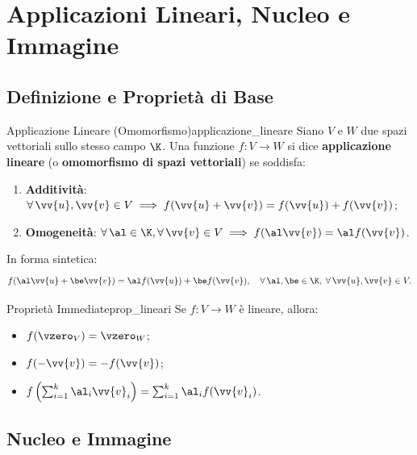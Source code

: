 
\chapter{Applicazioni Lineari, Nucleo e Immagine}
\label{chap:applicazioni_lineari}

\section{Definizione e Proprietà di Base}

\begin{definizione}{Applicazione Lineare (Omomorfismo)}{applicazione_lineare}
Siano $V$ e $W$ due spazi vettoriali sullo stesso campo $\K$. Una funzione $f: V \to W$ si dice \textbf{applicazione lineare} (o \textbf{omomorfismo di spazi vettoriali}) se soddisfa:
\begin{enumerate}[label=(\roman*)]
    \item \textbf{Additività}: $\forall\, \vv{u}, \vv{v} \in V \implies f(\vv{u} + \vv{v}) = f(\vv{u}) + f(\vv{v})$;
    \item \textbf{Omogeneità}: $\forall\, \al \in \K, \forall\, \vv{v} \in V \implies f(\al \vv{v}) = \al f(\vv{v})$.
\end{enumerate}
In forma sintetica:
\begin{equation}
    f(\al \vv{u} + \be \vv{v}) = \al f(\vv{u}) + \be f(\vv{v}), \quad \forall\, \al, \be \in \K,\; \forall\, \vv{u}, \vv{v} \in V.
\end{equation}
\end{definizione}

\begin{proposizione}{Proprietà Immediate}{prop_lineari}
Se $f: V \to W$ è lineare, allora:
\begin{itemize}
    \item $f(\vzero_V) = \vzero_W$;
    \item $f(-\vv{v}) = -f(\vv{v})$;
    \item $f\left(\sum_{i=1}^k \al_i \vv{v}_i\right) = \sum_{i=1}^k \al_i f(\vv{v}_i)$.
\end{itemize}
\end{proposizione}

\section{Nucleo e Immagine}

